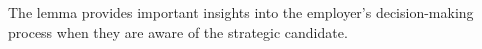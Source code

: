 \documentclass{article}
\begin{document}


The lemma provides important insights into the employer's decision-making process when they are aware of the strategic candidate.
\end{document}
